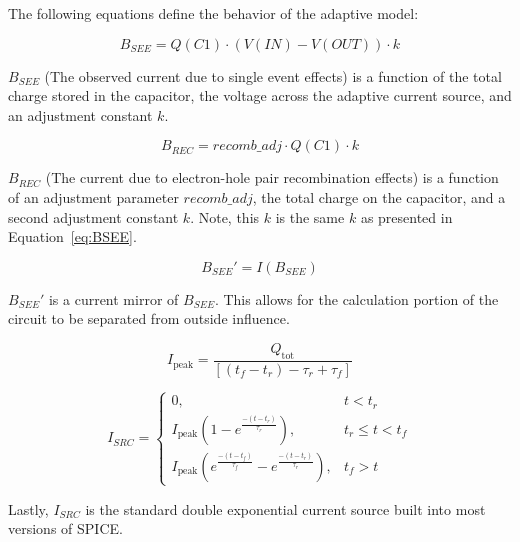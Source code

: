 \documentclass[conference]{IEEEtran}
\begin{document}
    The following equations define the behavior of the adaptive model:

    \begin{equation}
        B_{SEE} = Q(C1) \cdot (V(IN) - V(OUT)) \cdot k\label{eq:BSEE}
    \end{equation}

    \(B_{SEE}\) (The observed current due to single event effects) is a function of the total charge stored in the capacitor, the voltage across the adaptive current source, and an adjustment constant \(k\).

    \begin{equation}
        B_{REC} = recomb\_adj \cdot Q(C1) \cdot k\label{eq:BREC}
    \end{equation}

    \(B_{REC}\) (The current due to electron-hole pair recombination effects) is a function of an adjustment parameter \(recomb\_adj\), the total charge on the capacitor, and a second adjustment constant \(k\).
    Note, this \(k\) is the same \(k\) as presented in Equation~\ref{eq:BSEE}.

    \begin{equation}
        B_{SEE}' = I(B_{SEE})\label{eq:BSEE'}
    \end{equation}

    \(B_{SEE}'\) is a current mirror of \(B_{SEE}\).
    This allows for the calculation portion of the circuit to be separated from outside influence.

    \begin{equation}
        I_{\text{peak}} = \frac{Q_{\text{tot}}}{[(t_f - t_r) - \tau_r + \tau_f]}\label{eq:Ipeak}
    \end{equation}

    \begin{equation}
        I_{SRC} = \begin{cases}
                      0, & t < t_r \\
                      I_{\text{peak}}\left(1 - e^{\frac{-(t - t_r)}{\tau_r}}\right), & t_r \leq t < t_f \\
                      I_{\text{peak}}\left(e^{\frac{-(t - t_f)}{\tau_f}} - e^{\frac{-(t - t_r)}{\tau_r}}\right), & t_f > t
        \end{cases}\label{eq:ISRC}
    \end{equation}

    Lastly, \(I_{SRC}\) is the standard double exponential current source built into most versions of SPICE\@.
\end{document}
